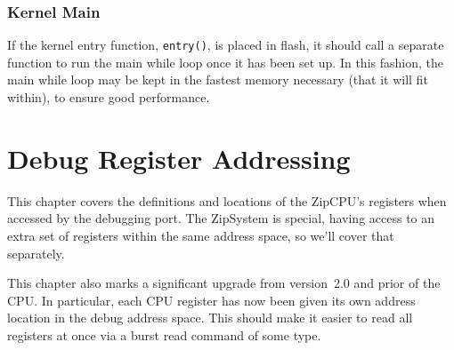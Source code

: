 \documentclass{gqtekspec}
\begin{document}
\subsection{Kernel Main}

If the kernel entry function, {\tt entry()}, is placed in flash, it should call
a separate function to run the main while loop once it has been set up.  In
this fashion, the main while loop may be kept in the fastest memory necessary
(that it will fit within), to ensure good performance.
\chapter{Debug Register Addressing}\label{chap:regs}
This chapter covers the definitions and locations of the ZipCPU's registers
when accessed by the debugging port.  The ZipSystem is special, having access
to an extra set of registers within the same address space, so we'll cover
that separately.

This chapter also marks a significant upgrade from version~2.0 and prior of the
CPU.  In particular, each CPU register has now been given its own address
location in the debug address space.  This should make it easier to read all
registers at once via a burst read command of some type.
\end{document}
